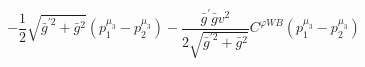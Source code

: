 %
\begin{dmath*}
%
  -  \frac{1}{2} \sqrt{{\bar g}^{\prime 2} + {\bar g}{}^2} \left(p_1^{\mu_3} - p_2^{\mu_3}\right)  -  \frac{{\bar g}^\prime {\bar g}{} v^2}{2 \sqrt{{\bar g}^{\prime 2} + {\bar g}{}^2}}C^{ \varphi  WB} \left(p_1^{\mu_3} - p_2^{\mu_3}\right)
%
\end{dmath*}
%
